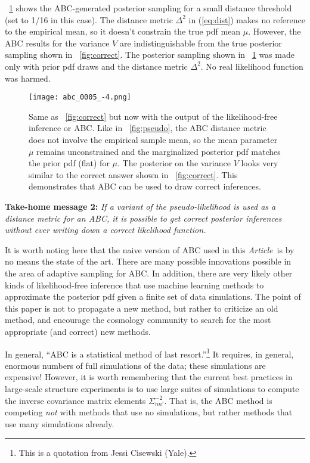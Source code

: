 \documentclass[12pt, letterpaper, preprint]{aastex}
\newcommand{\documentname}{\textsl{Article}}
\begin{document}
\figurename~\ref{fig:abc} shows the ABC-generated posterior sampling
for a small distance threshold (set to 1/16 in this case).
The distance metric $\Delta^2$ in (\ref{eq:dist}) makes no reference
to the empirical mean, so it doesn't constrain the true pdf mean
$\mu$.
However, the ABC results for the variance $V$ are indistinguishable
from the true posterior sampling shown in \figurename~\ref{fig:correct}.
The posterior sampling shown in \figurename~\ref{fig:abc} was made
only with prior pdf draws and the distance metric $\Delta^2$.
No real likelihood function was harmed.%
\begin{figure}
\texttt{[image: abc\_0005\_-4.png]}
\caption{Same as \figurename~\ref{fig:correct} but now with the output
  of the likelihood-free inference or ABC. Like in
  \figurename~\ref{fig:pseudo}, the ABC distance metric does not
  involve the empirical sample mean, so the mean parameter $\mu$
  remains unconstrained and the marginalized posterior pdf matches the
  prior pdf (flat) for $\mu$. The posterior on the variance $V$
  looks very similar to the correct answer shown in
  \figurename~\ref{fig:correct}. This demonstrates that ABC can be
  used to draw correct inferences.\label{fig:abc}}
\end{figure}

\textbf{Take-home message 2:} \emph{If a variant of the
  pseudo-likelihood is used as a distance metric for an ABC, it is possible to get
  correct posterior inferences without ever writing down a correct
  likelihood function.}

It is worth noting here that the naive version of ABC used in this
\documentname\ is by no means the state of the art. There are many
possible innovations possible in the area of adaptive sampling for ABC.
In addition, there are very likely other kinds of likelihood-free
inference that use machine learning methods to approximate the
posterior pdf given a finite set of data simulations.
The point of this paper is not to propagate a new method, but rather
to criticize an old method, and encourage the cosmology community to
search for the most appropriate (and correct) new methods.

In general, ``ABC is a statistical method of last
resort.''\footnote{This is a quotation from Jessi Cisewski (Yale).}
It requires, in general, enormous numbers of full simulations of the
data; these simulations are expensive!
However, it is worth remembering that the current best practices in
large-scale structure experiments is to use large suites of
simulations to compute the inverse covariance matrix elements
$\Sigma^{-2}_{nn'}$.
That is, the ABC method is competing \emph{not} with methods that use no
simulations, but rather methods that use many simulations already.
\end{document}
